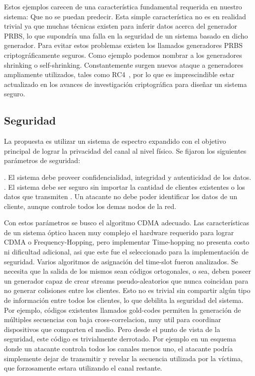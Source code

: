 Estos ejemplos carecen de una característica fundamental requerida en nuestro sistema: Que no se puedan predecir. Esta simple característica no es en realidad trivial ya que muchas técnicas existen para inferir datos acerca del generador PRBS, lo que supondría una falla en la seguridad de un sistema basado en dicho generador. Para evitar estos problemas existen los llamados generadores PRBS criptográficamente seguros. Como ejemplo podemos nombrar a los generadores shrinking o self-shrinking.
Constantemente surgen nuevos ataque a generadores ampliamente utilizados, tales como RC4~\cite{vaudenay2007passive}, por lo que es imprescindible estar actualizado en los avances de investigación criptográfica para diseñar un sistema seguro.


\subsection{Seguridad}
\label{Seguridad}
La propuesta es utilizar un sistema de espectro expandido con el objetivo principal de lograr la privacidad del canal al nivel físico.
Se fijaron los siguientes parámetros de seguridad:

. El sistema debe proveer confidencialidad, integridad y autenticidad de los datos.
. El sistema debe ser seguro sin importar la cantidad de clientes existentes o los datos que transmiten
. Un atacante no debe poder identificar los datos de un cliente, aunque controle todos los demas nodos de la red.

Con estos parámetros se busco el algoritmo CDMA adecuado. Las características de un sistema óptico hacen muy complejo el hardware requerido para lograr CDMA o Frequency-Hopping, pero implementar Time-hopping no presenta costo ni dificultad adicional, asi que este fue el seleccionado para la implementación de seguridad.
Varios algoritmos de asignación del time-slot fueron analizados. Se necesita que la salida de los mismos sean códigos ortogonales, o sea, deben poseer un generador capaz de crear streams pseudo-aleatorios que nunca coincidan para no generar colisiones entre los clientes. Esto no es trivial sin compartir algún tipo de información entre todos los clientes, lo que debilita la seguridad del sistema. Por ejemplo, códigos existentes llamados gold-codes permiten la generación de múltiples secuencias con baja cross-correlacion, muy util para coordinar dispositivos que comparten el medio. Pero desde el punto de vista de la seguridad, este código es trivialmente derrotado. Por ejemplo en un esquema donde un atacante controla todos los canales menos uno, el atacante podría simplemente dejar de transmitir y revelar la secuencia utilizada por la víctima, que forzosamente estara utilizando el canal restante.

